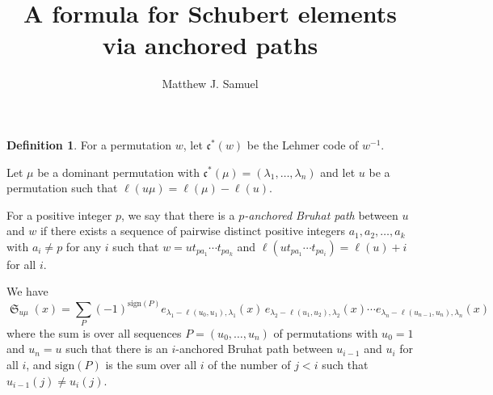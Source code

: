 \documentclass{amsart}
\title{A formula for Schubert elements via anchored paths}
\author{Matthew J. Samuel}
\theoremstyle{definition}
\newtheorem{definition}[theorem]{Definition}
\DeclareMathOperator{\sch}{\mathfrak{S}}
\newcommand{\code}{\mathfrak{c}}
\begin{document}
\maketitle

\begin{definition}
For a permutation $w$, let $\code^*(w)$ be the Lehmer code of $w^{-1}$.

Let $\mu$ be a dominant permutation with $\code^*(\mu) = (\lambda_1,\ldots,\lambda_n)$ and let $u$ be a permutation such that $\ell(u\mu) = \ell(\mu) - \ell(u)$.


For a positive integer $p$, we say that there is a \emph{$p$-anchored Bruhat path} between $u$ and $w$ if there exists a sequence of pairwise distinct positive integers $a_1,a_2,\ldots,a_k$ with $a_i\neq p$ for any $i$ such that $w=ut_{pa_1}\cdots t_{pa_k}$ and $\ell(ut_{pa_1}\cdots t_{pa_i})=\ell(u)+i$ for all $i$.
\end{definition}

We have
$$\sch_{u\mu}(x) = \sum_{P} (-1)^{\mathrm{sign}(P)}e_{\lambda_1-\ell(u_0,u_1),\lambda_1}(x)\, e_{\lambda_2-\ell(u_1,u_2),\lambda_2}(x)\cdots e_{\lambda_n-\ell(u_{n-1},u_n),\lambda_n}(x)$$
where the sum is over all sequences $P=(u_0,\ldots,u_n)$ of permutations with $u_0=1$ and $u_n=u$ such that there is an $i$-anchored Bruhat path between $u_{i-1}$ and $u_i$ for all $i$, and $\mathrm{sign}(P)$ is the sum over all $i$ of the number of $j<i$ such that $u_{i-1}(j)\neq u_i(j)$.
\end{document}
